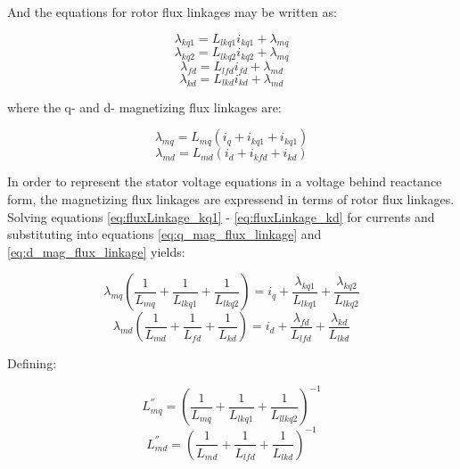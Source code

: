 And the equations for rotor flux linkages may be written as:

\begin{equation} \label{eq:fluxLinkage_kq1}
\lambda_{kq1} = L_{lkq1} i_{kq1} + \lambda_{mq}
\end{equation}
\begin{equation} \label{eq:fluxLinkage_kq2}
\lambda_{kq2} = L_{lkq2} i_{kq2} + \lambda_{mq}
\end{equation}
\begin{equation} \label{eq:fluxLinkage_fd}
\lambda_{fd} = L_{lfd} i_{fd} + \lambda_{md}
\end{equation}
\begin{equation} \label{eq:fluxLinkage_kd}
\lambda_{kd} = L_{lkd} i_{kd} + \lambda_{md}
\end{equation}

where the  q- and d- magnetizing flux linkages are:

\begin{equation} \label{eq:q_mag_flux_linkage}
\lambda_{mq} = L_{mq} (i_q + i_{kq1} + i_{kq1} )
\end{equation}
\begin{equation} \label{eq:d_mag_flux_linkage}
\lambda_{md} = L_{md} (i_d + i_{kfd} + i_{kd} )
\end{equation}

In order to represent the stator voltage equations in a voltage behind reactance form, the magnetizing flux linkages are expressend in terms of rotor flux linkages. Solving equations \ref{eq:fluxLinkage_kq1} - \ref{eq:fluxLinkage_kd} for currents and substituting into equations \ref{eq:q_mag_flux_linkage} and \ref{eq:d_mag_flux_linkage} yields:

\begin{equation} 
\lambda_{mq}  \left( \frac{1}{L_{mq}} + \frac{1}{L_{lkq1}} + \frac{1}{L_{lkq2}} \right)=  i_q + \frac{\lambda_{kq1}}{L_{lkq1}} +\frac{\lambda_{kq2}}{L_{lkq2}}
\end{equation}
\begin{equation}
\lambda_{md} \left( \frac{1}{L_{md}} + \frac{1}{L_{fd}} + \frac{1}{L_{kd}} \right) = i_d +\frac{\lambda_{fd}}{L_{lfd}} + \frac{\lambda_{kd}}{L_{lkd}}
\end{equation}

Defining:

\begin{equation}
L_{mq}^{''} = \left( \frac{1}{L_{mq}} + \frac{1}{L_{lkq1}} + \frac{1}{L_{llkq2}} \right)^{-1}
\end{equation}
\begin{equation}
L_{md}^{''} = \left( \frac{1}{L_{md}} + \frac{1}{L_{lfd}} + \frac{1}{L_{lkd}} \right)^{-1}
\end{equation}


